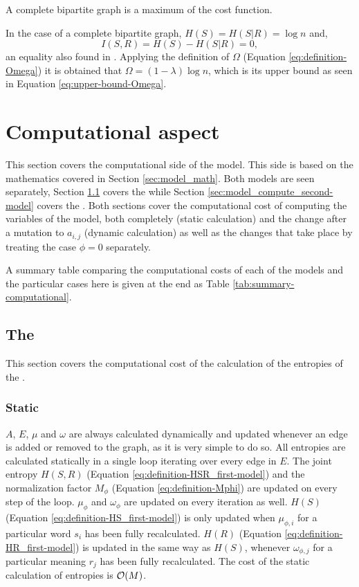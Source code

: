 A complete bipartite graph is a maximum of the cost function.

In the case of a complete bipartite graph, $H(S)=H(S|R)=\log n$ \cite{Cover1999} and,
\begin{equation*}
  I(S,R) = H(S) - H(S|R) = 0,
\end{equation*}
an equality also found in \cite{Cover1999}.
Applying the definition of $\Omega$ (Equation \eqref{eq:definition-Omega}) it is obtained that $\Omega=(1-\lambda) \log n$, which is its upper bound as seen in Equation \eqref{eq:upper-bound-Omega}.

\section{Computational aspect}
\label{sec:model_compute}

This section covers the computational side of the model.
This side is based on the mathematics covered in Section \ref{sec:model_math}.
Both models are seen separately, Section \ref{sec:model_compute_first-model} covers the \firstmodel{} while Section \ref{sec:model_compute_second-model} covers the \secondmodel{}.
Both sections cover the computational cost of computing the variables of the model, both completely (static calculation) and the change after a mutation to $a_{i,j}$ (dynamic calculation) as well as the changes that take place by treating the case $\phi=0$ separately.

A summary table comparing the computational costs of each of the models and the particular cases here is given at the end as Table \ref{tab:summary-computational}.

\subsection{The \firstmodel{}}
\label{sec:model_compute_first-model}

This section covers the computational cost of the calculation of the entropies of the \firstmodel{}.

\subsubsection{Static}

$A$, $E$, $\mu$ and $\omega$ are always calculated dynamically and updated whenever an edge is added or removed to the graph, as it is very simple to do so.
All entropies are calculated statically in a single loop iterating over every edge in $E$.
The joint entropy $H(S,R)$ (Equation \eqref{eq:definition-HSR_first-model}) and the normalization factor $M_\phi$ (Equation \eqref{eq:definition-Mphi}) are updated on every step of the loop.
$\mu_\phi$ and $\omega_\phi$ are updated on every iteration as well.
$H(S)$ (Equation \eqref{eq:definition-HS_first-model}) is only updated when $\mu_{\phi,i}$ for a particular word $s_i$ has been fully recalculated.
$H(R)$ (Equation \eqref{eq:definition-HR_first-model}) is updated in the same way as $H(S)$, whenever $\omega_{\phi,j}$ for a particular meaning $r_j$ has been fully recalculated.
The cost of the static calculation of entropies is $\mathcal{O}(M)$.

